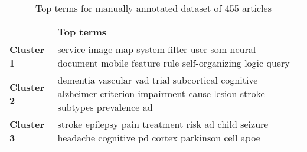 \begin{table}
\begin{tabular}{|p{2cm}|p{10.5cm}|} 
\hline %
\textbf{ } & \textbf{Top terms} \\ 
\hline 
\textbf{Cluster 1} & service image map system filter user som neural document mobile feature rule self-organizing logic query  \\ 
\hline
\hline 
\textbf{Cluster 2} & dementia vascular vad trial subcortical cognitive alzheimer criterion impairment cause lesion stroke subtypes prevalence ad  \\ 
\hline
\hline 
\textbf{Cluster 3} & stroke epilepsy pain treatment risk ad child seizure headache cognitive pd cortex parkinson cell apoe \\ 
\hline
\hline 
\end{tabular} %
\caption{Top terms for manually annotated dataset of 455 articles}
\label{table:topterms_455_hier}
\end{table} %
